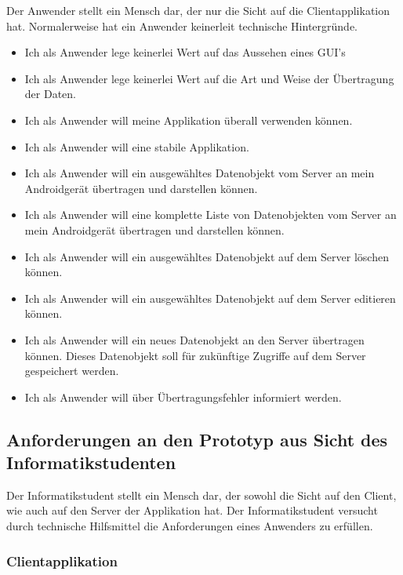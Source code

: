 \documentclass[listof=totocnumbered, bibliography=totocnumbered]{scrreprt}
\begin{document}
  Der Anwender stellt ein Mensch dar, der nur die Sicht auf die
  Clientapplikation hat. Normalerweise hat ein Anwender keinerleit technische
  Hintergründe.
  
  \begin{itemize}
    \item Ich als Anwender lege keinerlei Wert auf das Aussehen eines
    \ac{GUI}'s
    \item Ich als Anwender lege keinerlei Wert auf die Art und Weise der
    Übertragung der Daten.
    \item Ich als Anwender will meine Applikation überall verwenden können.
    \item Ich als Anwender will eine stabile Applikation.
    \item Ich als Anwender will ein ausgewähltes Datenobjekt vom Server an mein
    Androidgerät übertragen und darstellen können.
    \item Ich als Anwender will eine komplette Liste von Datenobjekten vom
    Server an mein Androidgerät übertragen und darstellen können.
    \item Ich als Anwender will ein ausgewähltes Datenobjekt auf dem Server
    löschen können.
    \item Ich als Anwender will ein ausgewähltes Datenobjekt auf dem Server
    editieren können.
    \item Ich als Anwender will ein neues Datenobjekt an den Server übertragen
    können. Dieses Datenobjekt soll für zukünftige Zugriffe auf dem Server
    gespeichert werden.
    \item Ich als Anwender will über Übertragungsfehler informiert werden.
  \end{itemize}
  
  \subsection{Anforderungen an den Prototyp aus Sicht des Informatikstudenten}
  
  Der Informatikstudent stellt ein Mensch dar, der sowohl die Sicht auf den
  Client, wie auch auf den Server der Applikation hat. Der Informatikstudent
  versucht durch technische Hilfsmittel die Anforderungen eines Anwenders zu
  erfüllen.
  
  \subsubsection{Clientapplikation}
  
\end{document}
